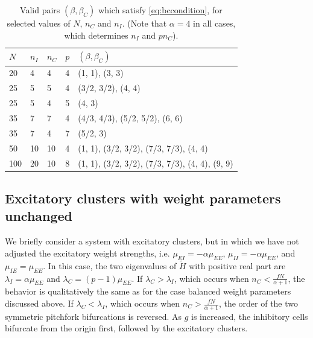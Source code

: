 \documentclass[reqno]{siamonline190516}
\newcommand{\revised}[1]{ \textbf{#1} }
\begin{document}
\begin{table}
\centering
    \begin{tabular}{lllll}
        \toprule
        $N$ & $n_I$ & $n_C$ & $p$ & $(\beta, \beta_C)$ \\
        \midrule
        20 & 4 & 4 & 4 & (1, 1), (3, 3) \\
        25 & 5 & 5 & 4 & (3/2, 3/2), (4, 4) \\
        25 & 5 & 4 & 5 & (4, 3) \\
        35 & 7 & 7 & 4 & (4/3, 4/3), (5/2, 5/2), (6, 6) \\
        35 & 7 & 4 & 7 & (5/2, 3) \\
        50 & 10 & 10 & 4 & (1, 1), (3/2, 3/2), (7/3, 7/3), (4, 4) \\
        100 & 20 & 10 & 8 & (1, 1), (3/2, 3/2), (7/3, 7/3), (4, 4), (9, 9) \\
        \bottomrule
    \end{tabular}
    \vspace{0.25cm}
    \caption{Valid pairs $(\beta, \beta_C)$ which satisfy \cref{eq:bccondition}, for selected values of $N$, $n_C$ and $n_I$. (Note that $\alpha = 4$ in all cases, which determines $n_I$ and $p n_C$).}
    \label{table:validbeta}
\end{table}

\subsection{Excitatory clusters with weight parameters unchanged}

We briefly consider a system with excitatory clusters, but in which we have not adjusted the excitatory weight strengths, i.e. $\mu_{EI} = -\alpha \mu_{EE}$, $\mu_{II} = -\alpha \mu_{EE}$, and $\mu_{IE} = \mu_{EE}$. In this case, the two eigenvalues of \revised{$\tilde{H}$} with positive real part are $\lambda_I = \alpha \mu_{EE}$ and $\lambda_C = (p-1)\mu_{EE}$. If $\lambda_C > \lambda_I$, which occurs when $n_C < \frac{f N}{\alpha+1}$, the behavior is qualitatively the same as for the case balanced weight parameters discussed above. If  $\lambda_C < \lambda_I$, which occurs when $n_C > \frac{f N}{\alpha+1}$, the order of the two symmetric pitchfork bifurcations is reversed. As $g$ is increased, the inhibitory cells bifurcate from the origin first, followed by the excitatory clusters.
\end{document}
